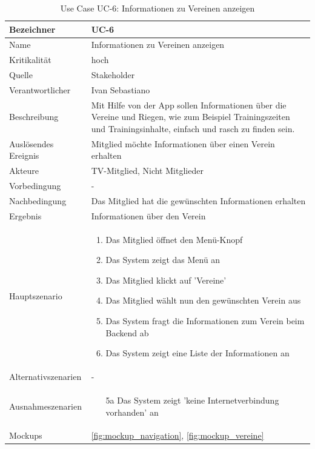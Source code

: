 \begin{table}[ht]
\centering
  \begin{tabular}{ l | p{10cm} }
	\hline
	\rowcolor{gray}
	Bezeichner		&	UC-6\\ \hline
	Name			&	Informationen zu Vereinen anzeigen\\ \hline
	Kritikalität		&	hoch\\ \hline
	Quelle			&	Stakeholder\\ \hline
	Verantwortlicher	&	Ivan Sebastiano\\ \hline
	Beschreibung	&	Mit Hilfe von der App sollen Informationen über die Vereine und Riegen, wie zum Beispiel Trainingszeiten und Trainingsinhalte, einfach und rasch zu finden sein.\\ \hline
	Auslösendes Ereignis&	Mitglied möchte Informationen über einen Verein erhalten\\ \hline
	Akteure		&	TV-Mitglied, Nicht Mitglieder\\ \hline
	Vorbedingung	&	-\\ \hline
	Nachbedingung	&	Das Mitglied hat die gewünschten Informationen erhalten\\ \hline
	Ergebnis		&	Informationen über den Verein\\ \hline
	Hauptszenario	&	\begin{enumerate}
					\item Das Mitglied öffnet den Menü-Knopf
					\item Das System zeigt das Menü an
					\item Das Mitglied klickt auf 'Vereine'
					\item Das Mitglied wählt nun den gewünschten Verein aus
					\item Das System fragt die Informationen zum Verein beim Backend ab
					\item Das System zeigt eine Liste der Informationen an
					\end{enumerate}
					\\ \hline
	Alternativszenarien	&	-\\ \hline
	Ausnahmeszenarien&	\begin{enumerate}
					\item[5a] Das System zeigt 'keine Internetverbindung vorhanden' an
					\end{enumerate}
					\\ \hline
	Mockups	 	&	\ref{fig:mockup_navigation}, \ref{fig:mockup_vereine}
  \end{tabular}
   \caption{Use Case UC-6: Informationen zu Vereinen anzeigen}\label{table:use_case_6}
\end{table}

